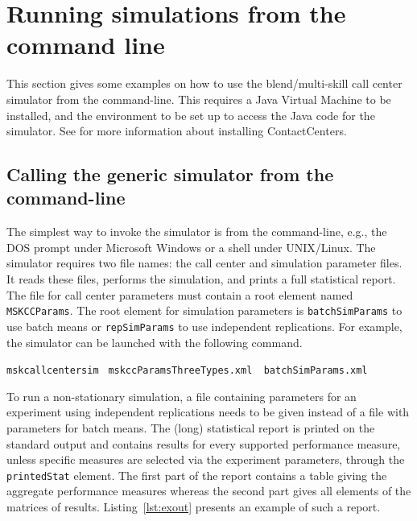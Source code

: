 \section{Running simulations from the command line}
\label{sec:mskuse}

This section gives some examples on how to use the blend/multi-skill
call center simulator from the command-line.
This requires a Java Virtual Machine to be installed, and the
environment to be set up to access the Java code for the simulator.
See \ccurl{} for more information
about installing ContactCenters.

\subsection{Calling the generic simulator from the command-line}
\label{sec:cmdline}

The simplest way to invoke the simulator is from the command-line,
e.g., the DOS prompt under Microsoft Windows or a shell under
UNIX/Linux.  The
simulator requires two file names: the call
center and simulation parameter files.  It reads these
files, performs the simulation, and prints a full statistical report.
The file for call center parameters must contain a root element named
\texttt{MSKCCParams}.
The root element for simulation parameters is
\texttt{batch\-Sim\-Params} to use batch means
or \texttt{rep\-Sim\-Params} to use independent replications.
For example, the simulator can be launched with the following
command.

\noindent\texttt{mskcallcentersim}
 \texttt{ mskccParamsThreeTypes.xml \ batchSimParams.xml}

To run a non-stationary simulation, a file containing parameters for an
experiment using independent replications needs to be given instead of
a file with parameters for batch means.
The (long) statistical report is printed on the standard output and
contains results for every supported performance measure, unless
specific measures are selected via the experiment parameters,
through the
\texttt{printed\-Stat} element.
The first part of the report contains a table giving the aggregate
performance measures whereas the second part gives all elements of the
matrices of results.
Listing~\ref{lst:exout} presents an example of such a report.

